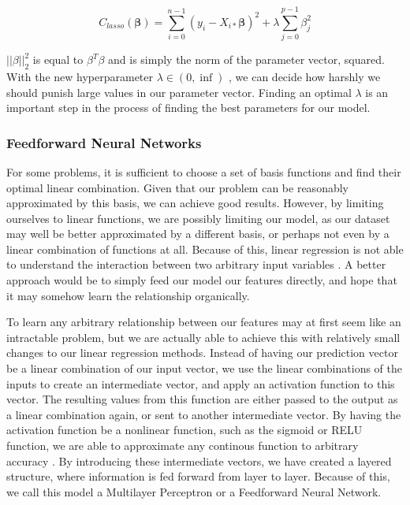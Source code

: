 \documentclass[onecolumn,10pt,cleanfoot]{asme2ej}
\begin{document}
\begin{equation}
	C_{lasso}(\bm{\beta}) = \sum_{i=0}^{n-1}(y_i-X_{i*}\bm{\beta})^2 + \lambda \sum_{j=0}^{p-1} \beta_j^2
\end{equation}

$||\beta||_2^2$ is equal to $\beta^T\beta$ and is simply the norm of the parameter vector, squared. With the new hyperparameter $\lambda \in (0, \inf)$ , we can decide how harshly we should punish large values in our parameter vector. Finding an optimal $\lambda$ is an important step in the process of finding the best parameters for our model.

\subsubsection{Feedforward Neural Networks}

For some problems, it is sufficient to choose a set of basis functions and find their optimal linear combination. Given that our problem can be reasonably approximated by this basis, we can achieve good results. However, by limiting ourselves to linear functions, we are possibly limiting our model, as our dataset may well be better approximated by a different basis, or perhaps not even by a linear combination of functions at all. Because of this, linear regression is not able to understand the interaction between two arbitrary input variables \cite[165]{gbc}. A better approach would be to simply feed our model our features directly, and hope that it may somehow learn the relationship organically.

To learn any arbitrary relationship between our features may at first seem like an intractable problem, but we are actually able to achieve this with relatively small changes to our linear regression methods. Instead of having our prediction vector be a linear combination of our input vector, we use the linear combinations of the inputs to create an intermediate vector, and apply an activation function to this vector. The resulting values from this function are either passed to the output as a linear combination again, or sent to another intermediate vector. By having the activation function be a nonlinear function, such as the sigmoid or RELU function, we are able to approximate any continous function to arbitrary accuracy \cite[230]{cmb}. By introducing these intermediate vectors, we have created a layered structure, where information is fed forward from layer to layer. Because of this, we call this model a Multilayer Perceptron or a Feedforward Neural Network.
\end{document}
